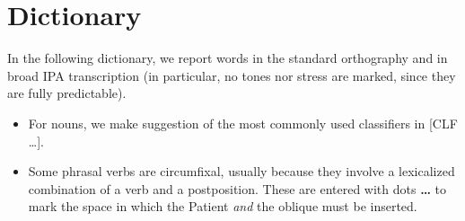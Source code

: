 \documentclass[11pt]{book}
\newcommand{\qcn}[1]{\textbf{#1}}
\begin{document}
\section{Dictionary}

In the following dictionary, we report words in the standard orthography and in broad IPA transcription (in particular, no tones nor stress are marked, since they are fully predictable).

\begin{itemize}
	\item For nouns, we make suggestion of the most commonly used classifiers in [CLF \ldots].
	\item Some phrasal verbs are circumfixal, usually because they involve a lexicalized combination of a verb and a postposition. These are entered with dots \qcn{\ldots} to mark the space in which the Patient \emph{and} the oblique must be inserted.
\end{itemize}





\newcommand{\dictentry}[3]{\qcn{#1} - /#2/ \hangindent=0.4cm #3 \par }
\newcommand{\dictsense}[3]{$\bullet$~\emph{#1} #2 #3 }
\newcommand{\dictexample}[2]{\qcn{#1} \emph{#2}}
\newcommand{\dictclassifiers}[1]{\begin{scriptsize}[CLF #1] \end{scriptsize}}
\newcommand{\dictref}[1]{\qcn{#1}}
\newcommand{\dictsensesep}{\,\,}

\begin{multicols}{2}
\begin{singlespace}



\end{singlespace}
\end{multicols}
\end{document}
